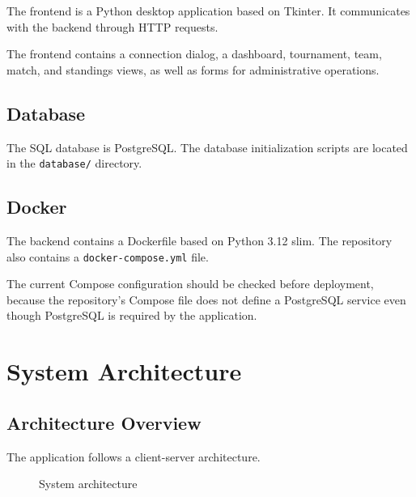 \documentclass[12pt,a4paper]{article}
\begin{document}
The frontend is a Python desktop application based on Tkinter.
It communicates with the backend through HTTP requests.

The frontend contains a connection dialog, a dashboard, tournament,
team, match, and standings views, as well as forms for administrative
operations.

\subsection{Database}

The SQL database is PostgreSQL. The database initialization scripts are
located in the \texttt{database/} directory.

\subsection{Docker}

The backend contains a Dockerfile based on Python 3.12 slim.
The repository also contains a \texttt{docker-compose.yml} file.

The current Compose configuration should be checked before deployment,
because the repository's Compose file does not define a PostgreSQL
service even though PostgreSQL is required by the application.


\section{System Architecture}

\subsection{Architecture Overview}

The application follows a client-server architecture.

\begin{figure}[H]
\centering
{}
\caption{System architecture}
\label{fig:architecture}
\end{figure}
\end{document}
